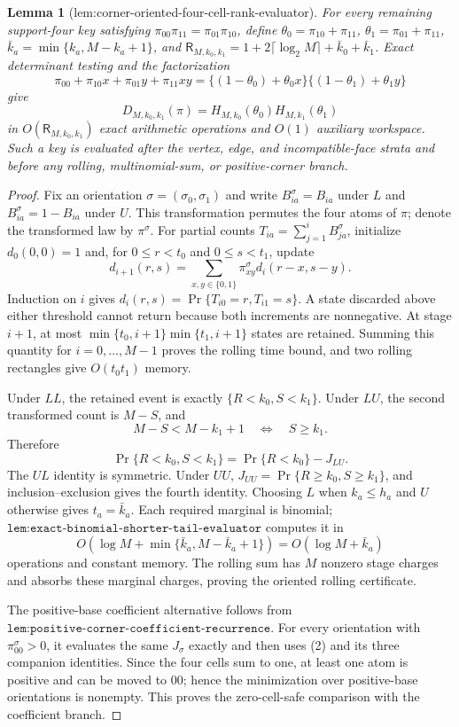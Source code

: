 \documentclass{article}
\newtheorem{lemma}{Lemma}
\begin{document}
\begin{lemma}[lem:corner-oriented-four-cell-rank-evaluator]
For every remaining support-four key satisfying \(\pi_{00}\pi_{11}=\pi_{01}\pi_{10}\), define \(\theta_0=\pi_{10}+\pi_{11}\), \(\theta_1=\pi_{01}+\pi_{11}\), \(\bar k_a=\min\{k_a,M-k_a+1\}\), and \(\mathsf R_{M,k_0,k_1}=1+2\lceil\log_2M\rceil+\bar k_0+\bar k_1\). Exact determinant testing and the factorization
\[
\pi_{00}+\pi_{10}x+\pi_{01}y+\pi_{11}xy
=\{(1-\theta_0)+\theta_0x\}\{(1-\theta_1)+\theta_1y\}
\]
give
\[
D_{M,k_0,k_1}(\pi)=H_{M,k_0}(\theta_0)H_{M,k_1}(\theta_1)
\]
in \(O(\mathsf R_{M,k_0,k_1})\) exact arithmetic operations and \(O(1)\) auxiliary workspace. Such a key is evaluated after the vertex, edge, and incompatible-face strata and before any rolling, multinomial-sum, or positive-corner branch.
\end{lemma}
\begin{proof}
Fix an orientation \(\sigma=(\sigma_0,\sigma_1)\) and write \(B_{ia}^{\sigma}=B_{ia}\) under \(L\) and \(B_{ia}^{\sigma}=1-B_{ia}\) under \(U\). This transformation permutes the four atoms of \(\pi\); denote the transformed law by \(\pi^\sigma\). For partial counts \(T_{ia}=\sum_{j=1}^iB_{ja}^{\sigma}\), initialize \(d_0(0,0)=1\) and, for \(0\le r<t_0\) and \(0\le s<t_1\), update
\[
d_{i+1}(r,s)=\sum_{x,y\in\{0,1\}}\pi^\sigma_{xy}d_i(r-x,s-y).
\tag{1}
\]
Induction on \(i\) gives \(d_i(r,s)=\Pr\{T_{i0}=r,T_{i1}=s\}\). A state discarded above either threshold cannot return because both increments are nonnegative. At stage \(i+1\), at most
\(\min\{t_0,i+1\}\min\{t_1,i+1\}\) states are retained. Summing this quantity for \(i=0,\ldots,M-1\) proves the rolling time bound, and two rolling rectangles give \(O(t_0t_1)\) memory.

Under \(LL\), the retained event is exactly \(\{R<k_0,S<k_1\}\). Under \(LU\), the second transformed count is \(M-S\), and
\[
M-S<M-k_1+1\quad\Longleftrightarrow\quad S\ge k_1.
\]
Therefore
\[
\Pr\{R<k_0,S<k_1\}=\Pr\{R<k_0\}-J_{LU}.
\tag{2}
\]
The \(UL\) identity is symmetric. Under \(UU\), \(J_{UU}=\Pr\{R\ge k_0,S\ge k_1\}\), and inclusion--exclusion gives the fourth identity. Choosing \(L\) when \(k_a\le h_a\) and \(U\) otherwise gives \(t_a=\bar k_a\). Each required marginal is binomial; \(\texttt{lem:exact-binomial-shorter-tail-evaluator}\) computes it in
\[
O\!\left(\log M+\min\{\bar k_a,M-\bar k_a+1\}\right)=O(\log M+\bar k_a)
\]
operations and constant memory. The rolling sum has \(M\) nonzero stage charges and absorbs these marginal charges, proving the oriented rolling certificate.

The positive-base coefficient alternative follows from
\(\texttt{lem:positive-corner-coefficient-recurrence}\). For every orientation with \(\pi^\sigma_{00}>0\), it evaluates the same \(J_\sigma\) exactly and then uses (2) and its three companion identities. Since the four cells sum to one, at least one atom is positive and can be moved to \(00\); hence the minimization over positive-base orientations is nonempty. This proves the zero-cell-safe comparison with the coefficient branch.


\end{proof}
\end{document}

